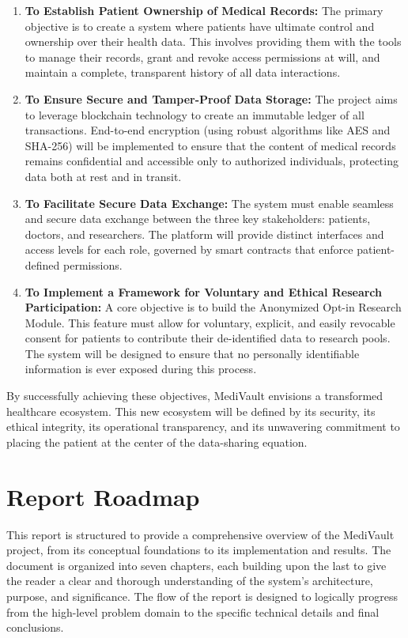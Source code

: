 \begin{enumerate}
    \item \textbf{To Establish Patient Ownership of Medical Records:} The primary objective is to create a system where patients have ultimate control and ownership over their health data. This involves providing them with the tools to manage their records, grant and revoke access permissions at will, and maintain a complete, transparent history of all data interactions.

    \item \textbf{To Ensure Secure and Tamper-Proof Data Storage:} The project aims to leverage blockchain technology to create an immutable ledger of all transactions. End-to-end encryption (using robust algorithms like AES and SHA-256) will be implemented to ensure that the content of medical records remains confidential and accessible only to authorized individuals, protecting data both at rest and in transit.

    \item \textbf{To Facilitate Secure Data Exchange:} The system must enable seamless and secure data exchange between the three key stakeholders: patients, doctors, and researchers. The platform will provide distinct interfaces and access levels for each role, governed by smart contracts that enforce patient-defined permissions.

    \item \textbf{To Implement a Framework for Voluntary and Ethical Research Participation:} A core objective is to build the Anonymized Opt-in Research Module. This feature must allow for voluntary, explicit, and easily revocable consent for patients to contribute their de-identified data to research pools. The system will be designed to ensure that no personally identifiable information is ever exposed during this process.
\end{enumerate}

By successfully achieving these objectives, MediVault envisions a transformed healthcare ecosystem. This new ecosystem will be defined by its security, its ethical integrity, its operational transparency, and its unwavering commitment to placing the patient at the center of the data-sharing equation.

\section{Report Roadmap}
This report is structured to provide a comprehensive overview of the MediVault project, from its conceptual foundations to its implementation and results. The document is organized into seven chapters, each building upon the last to give the reader a clear and thorough understanding of the system's architecture, purpose, and significance. The flow of the report is designed to logically progress from the high-level problem domain to the specific technical details and final conclusions.

